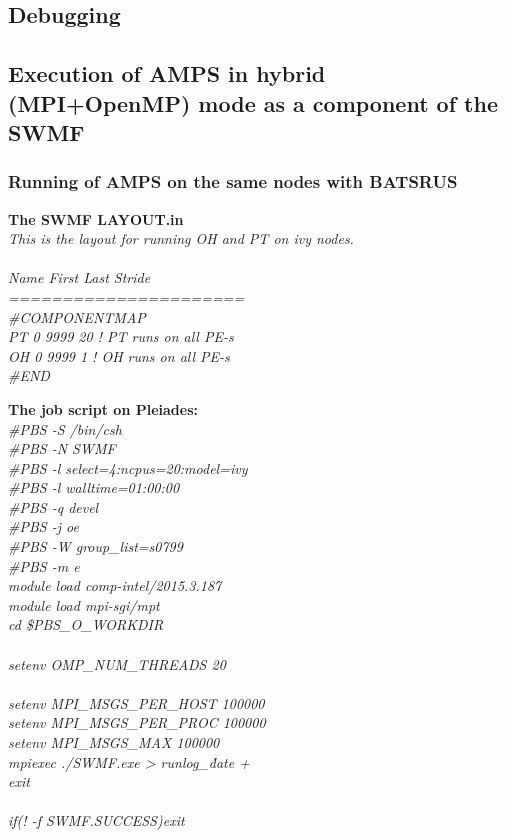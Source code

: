 \subsection {Debugging}


\subsection{Execution of AMPS in hybrid (MPI+OpenMP) mode as a component of the SWMF}

\subsubsection{Running of AMPS on the same nodes with BATSRUS}

{\bf The SWMF LAYOUT.in}
\\
{\it This is the layout for running OH and PT on ivy nodes.\\
\\
Name First Last Stride\\
======================\\
\#COMPONENTMAP\\
PT       0 9999    20   ! PT runs on all PE-s\\
OH       0 9999    1   ! OH runs on all PE-s\\
\#END\\
}



{\bf The job script on Pleiades:}
\\
{\it \#PBS -S /bin/csh\\
\#PBS -N SWMF\\
\#PBS -l select=4:ncpus=20:model=ivy\\
\#PBS -l walltime=01:00:00\\
\#PBS -q devel\\
\#PBS -j oe\\
\#PBS -W group\_list=s0799\\
\#PBS -m e\\
module load comp-intel/2015.3.187\\
module load mpi-sgi/mpt\\
cd \$PBS\_O\_WORKDIR\\
\\
setenv OMP\_NUM\_THREADS 20\\
\\
setenv MPI\_MSGS\_PER\_HOST 100000\\
setenv MPI\_MSGS\_PER\_PROC 100000\\
setenv MPI\_MSGS\_MAX 100000\\
mpiexec ./SWMF.exe > runlog\_\'date +%
\\
exit\\
\\
if(! -f SWMF.SUCCESS)exit\\
}






